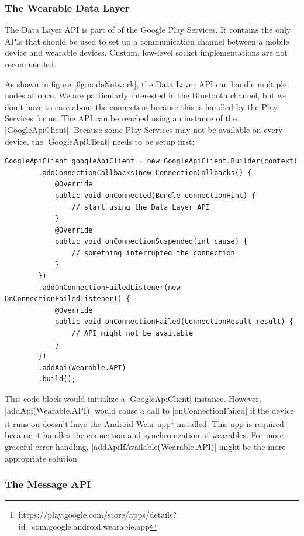 \subsubsection{The Wearable Data Layer}

The Data Layer API is part of of the Google Play Services.
It contains the only APIs that should be used to set up a communication channel between a mobile device and wearable devices. 
Custom, low-level socket implementations are not recommended.

As shown in figure \ref{fig:nodeNetwork}, the Data Layer API can handle multiple nodes at once.
We are particularly interested in the Bluetooth channel, but we don't have to care about the connection because this is handled by the Play Services for us.
The API can be reached using an instance of the |GoogleApiClient|\cite{androiddocs:googleapiclient}.
Because some Play Services may not be available on every device, the |GoogleApiClient| needs to be setup first:

\begin{lstlisting}[label=googleapiclient]
GoogleApiClient googleApiClient = new GoogleApiClient.Builder(context)
		.addConnectionCallbacks(new ConnectionCallbacks() {
			@Override
			public void onConnected(Bundle connectionHint) {
				// start using the Data Layer API
			}
			@Override
			public void onConnectionSuspended(int cause) {
				// something interrupted the connection
			}
		})
		.addOnConnectionFailedListener(new OnConnectionFailedListener() {
			@Override
			public void onConnectionFailed(ConnectionResult result) {
				// API might not be available
			}
		})
		.addApi(Wearable.API)
		.build();
\end{lstlisting}

This code block would initialize a |GoogleApiClient| instance.
However, |addApi(Wearable.API)| would cause a call to |onConnectionFailed| if the device it runs on doesn't have the Android Wear app\footnote{https://play.google.com/store/apps/details?id=com.google.android.wearable.app} installed.
This app is required because it handles the connection and synchronization of wearables.
For more graceful error handling, |addApiIfAvailable(Wearable.API)| might be the more appropriate solution.

\subsubsection{The Message API}

